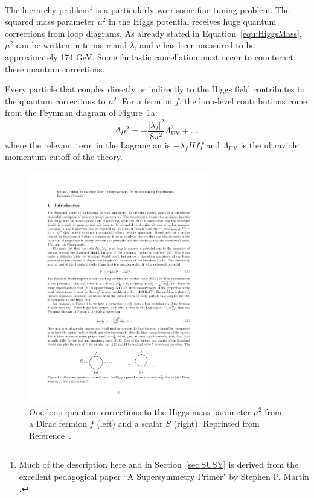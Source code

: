 The hierarchy problem\footnote{Much of the description here and in Section~\ref{sec:SUSY} is derived from the excellent pedagogical paper ``A Supersymmetry Primer" by Stephen P. Martin \cite{SUSYprimer}.} is a particularly worrisome fine-tuning problem. The squared mass parameter $\mu^2$ in the Higgs potential receives huge quantum corrections from loop diagrams. As already stated in Equation~\ref{equ:HiggsMass}, $\mu^2$ can be written in terms $v$ and $\lambda$, and $v$ has been measured to be approximately 174 GeV. Some fantastic cancellation must occur to counteract these quantum corrections.

Every particle that couples directly or indirectly to the Higgs field contributes to the quantum corrections to $\mu^2$. For a fermion $f$, the loop-level contributions come from the Feynman diagram of Figure~\ref{fig:hierarchy}a:
\begin{equation}
\Delta\mu^2 = -\frac{|\lambda_f|^2}{8\pi^2}\Lambda^2_\mathrm{UV} + ....
\label{equ:corrFermion}
\end{equation}
where the relevant term in the Lagrangian is $-\lambda_fH\bar{f}f$ and $\Lambda_\mathrm{UV}$ is the ultraviolet momentum cutoff of the theory. 

\begin{figure}[htbp]
    \centering
    \includegraphics[width=0.7\textwidth]{Figures/Theory/hierarchyLoop.pdf}
    \caption[One-loop quantum corrections to the Higgs mass parameter.]{One-loop quantum corrections to the Higgs mass parameter $\mu^2$ from a Dirac fermion $f$ (left) and a scalar $S$ (right).
    Reprinted from Reference~\cite{SUSYprimer}.}
    \label{fig:hierarchy}
\end{figure}



